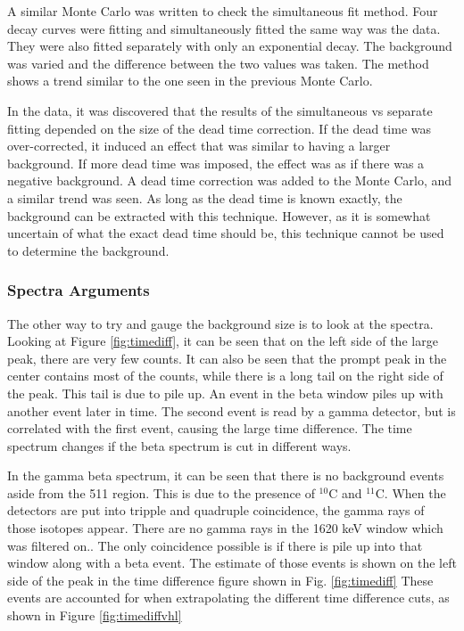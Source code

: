 A similar Monte Carlo was written to check the simultaneous fit method.
Four decay curves were fitting and simultaneously fitted the same way was the data.
They were also fitted separately with only an exponential decay.
The background was varied and the difference between the two values was taken.
The method shows a trend similar to the one seen in the previous Monte Carlo.

In the data, it was discovered that the results of the simultaneous vs separate fitting depended on the size of the dead time correction.
If the dead time was over-corrected, it induced an effect that was similar to having a larger background.
If more dead time was imposed, the effect was as if there was a negative background.
A dead time correction was added to the Monte Carlo, and a similar trend was seen.
As long as the dead time is known exactly, the background can be extracted with this technique. 
However, as it is somewhat uncertain of what the exact dead time should be, this technique cannot be used to determine the background.

\subsubsection{Spectra Arguments}
The other way to try and gauge the background size is to look at the spectra.
Looking at Figure \ref{fig:timediff}, it can be seen that on the left side of the large peak, there are very few counts.
It can also be seen that the prompt peak in the center contains most of the counts, while there is a long tail on the right side of the peak.
This tail is due to pile up. 
An event in the beta window piles up with another event later in time. 
The second event is read by a gamma detector, but is correlated with the first event, causing the large time difference.
The time spectrum changes if the beta spectrum is cut in different ways.

In the gamma beta spectrum, it can be seen that there is no background events aside from the 511 region.
This is due to the presence of $^{10}$C and $^{11}$C.
When the detectors are put into tripple and quadruple coincidence, the gamma rays of those isotopes appear.
There are no gamma rays in the 1620 keV window which was filtered on..
The only coincidence possible is if there is pile up into that window along with a beta event.
The estimate of those events is shown on the left side of the peak in the time difference figure shown in Fig. \ref{fig:timediff}  
These events are accounted for when extrapolating the different time difference cuts, as shown in Figure \ref{fig:timediffvhl}

